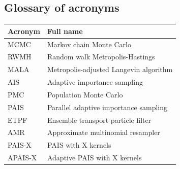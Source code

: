 \documentclass[final]{siamltex}
\begin{document}
\begin{appendix}

\section{Glossary of acronyms}

\begin{table}[h!]
\centering
\begin{tabular}{|l|l|}
\hline
Acronym & Full name                              \\ \hline
MCMC    & Markov chain Monte Carlo               \\
RWMH    & Random walk Metropolis-Hastings        \\
MALA    & Metropolis-adjusted Langevin algorithm \\
AIS     & Adaptive importance sampling           \\
PMC     & Population Monte Carlo                 \\
PAIS    & Parallel adaptive importance sampling  \\
ETPF    & Ensemble transport particle filter     \\
AMR     & Approximate multinomial resampler      \\
PAIS-X  & PAIS with X kernels                    \\
APAIS-X & Adaptive PAIS with X kernels          \\ \hline
\end{tabular}
\end{table}

\end{appendix}



\end{document}

